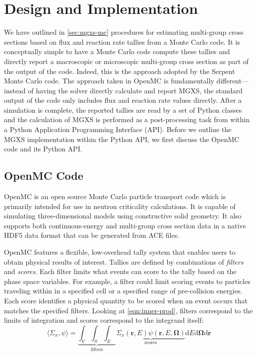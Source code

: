 \section{Design and Implementation}
\label{sec:design}

We have outlined in \cref{sec:mgxs-mc} procedures for estimating multi-group cross sections based on flux and reaction rate tallies from a Monte Carlo code. It is conceptually simple to have a Monte Carlo code compute these tallies and directly report a macroscopic or microscopic multi-group cross section as part of the output of the code. Indeed, this is the approach adopted by the Serpent Monte Carlo code\cite{leppanen2016homog}. The approach taken in OpenMC is fundamentally different---instead of having the solver directly calculate and report MGXS, the standard output of the code only includes flux and reaction rate values directly. After a simulation is complete, the reported tallies are read by a set of Python classes and the calculation of MGXS is performed as a post-processing task from within a Python Application Programming Interface (API). Before we outline the MGXS implementation within the Python API, we first discuss the OpenMC code and its Python API.

\subsection{OpenMC Code}
\label{subsec:openmc-overview}

OpenMC is an open source Monte Carlo particle transport code which is primarily intended for use in neutron criticality calculations. It is capable of simulating three-dimensional models using constructive solid geometry. It also supports both continuous-energy and multi-group cross section data in a native HDF5\cite{koranne2011hdf5} data format\cite{romano2017epjwoc} that can be generated from ACE files.

OpenMC features a flexible, low-overhead tally system that enables users to obtain physical results of interest. Tallies are defined by combinations of \emph{filters} and \emph{scores}. Each filter limits what events can score to the tally based on the phase space variables. For example, a filter could limit scoring events to particles traveling within in a specified cell or a specified range of pre-collision energies. Each score identifies a physical quantity to be scored when an event occurs that matches the specified filters. Looking at \cref{eqn:inner-prod}, filters correspond to the limits of integration and scores correspond to the integrand itself:
\begin{equation}
\langle \Sigma_x, \psi \rangle = \underbrace{\int_{V} \int_{S} \int_{E}}_{\text{filters}} \underbrace{\Sigma_{x}(\mathbf{r},E)\psi(\mathbf{r},E,\mathbf{\Omega})}_{\text{scores}} \mathrm{d}E\mathrm{d}\mathbf{\Omega}\mathrm{d}\mathbf{r}
\end{equation}

